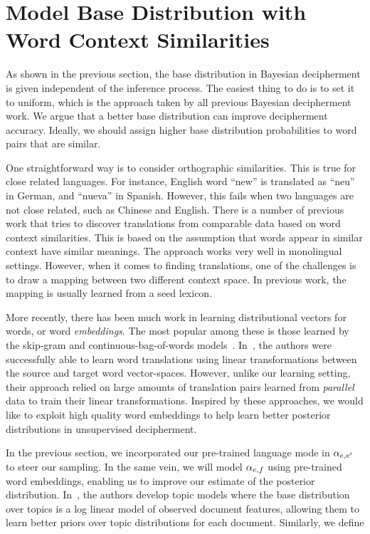 \section{Model Base Distribution with Word Context Similarities}
As shown in the previous section, the base distribution in Bayesian decipherment is given independent of the inference process. The easiest thing to do is to set it to uniform, which is the approach taken by all previous Bayesian decipherment work. We argue that a better base distribution can improve decipherment accuracy. Ideally, we should assign higher base distribution probabilities to word pairs that are similar.

One straightforward way is to consider orthographic similarities. This is true for close related languages. For instance, English word ``new'' is translated as ``neu'' in German, and ``nueva'' in Spanish. However, this fails when two languages are not close related, such as Chinese and English. There is a number of previous work that tries to discover translations from comparable data based on word context similarities. This is based on the assumption that words appear in similar context have similar meanings. The approach works very well in monolingual settings. However, when it comes to finding translations, one of the challenges is to draw a mapping between two different context space. In previous work, the mapping is usually learned from a seed lexicon.

More recently, there has been much work in learning distributional vectors for words, or word \emph{embeddings}. The most popular among these is those learned by the skip-gram and continuous-bag-of-words models~\cite{mikolov2013efficient}. In~\cite{mikolov2013distributed}, the authors were successfully able to learn word translations using linear transformations between the source and target word vector-spaces. However, unlike our learning setting, their approach relied on large amounts of translation pairs learned from \emph{parallel} data to train their linear transformations. Inspired by these approaches, we would like to exploit high quality word embeddings to help learn better posterior distributions in unsupervised decipherment. 

In the previous section, we incorporated our pre-trained language mode in $\alpha_{e,e'}$ to steer our sampling. In the same vein, we will model $\alpha_{e,f}$ using pre-trained word embeddings, enabling us to improve our estimate of the posterior distribution. In~\cite{mimno2012topic}, the authors develop topic models where the base distribution over topics is a log linear model of observed document features, allowing them to learn better priors over topic distributions for each document. Similarly, we define

